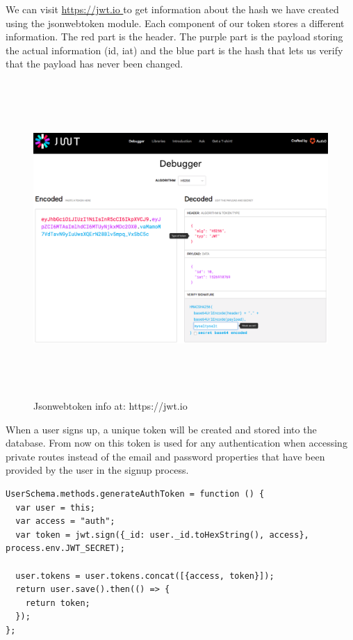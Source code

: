 \documentclass[11pt]{article}
\begin{document}
We can visit \url{https://jwt.io } to get information about the hash we have created using the jsonwebtoken module. Each component of our token stores a different information. The red part is the header. The purple part is the payload storing the actual information (id, iat) and the blue part is the hash that lets us verify that the payload has never been changed. 

	\begin{figure}[H] 
		\centering 
		\includegraphics[height=12cm]{figures/jwt}    
		\caption[Jsonwebtoken info at: https://jwt.io]{Jsonwebtoken info at: https://jwt.io}     
		\label{fig: Jsonwebtoken info at: https://jwt.io}      
	\end{figure}    

 


When a user signs up, a unique token will be created and stored into the database. From now on this token is used for any authentication when accessing private routes instead of the email and password properties that have been provided by the user in the signup process. 

\begin{lstlisting}
UserSchema.methods.generateAuthToken = function () {
  var user = this; 
  var access = "auth";
  var token = jwt.sign({_id: user._id.toHexString(), access}, process.env.JWT_SECRET);

  user.tokens = user.tokens.concat([{access, token}]);
  return user.save().then(() => {
    return token;
  });
};

\end{lstlisting}
\end{document}
